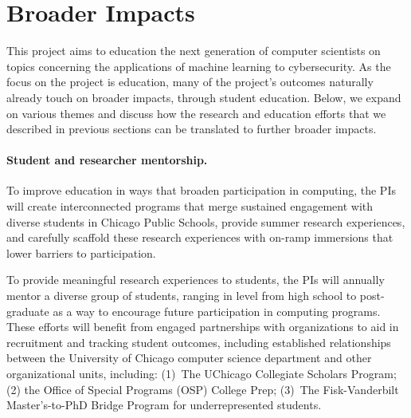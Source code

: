 \section{Broader Impacts}\label{sec:impacts}

This project aims to education the next generation of computer scientists on
topics concerning the applications of machine learning to cybersecurity.  As
the focus on the project is education, many of the project's outcomes
naturally already touch on broader impacts, through student education. Below,
we expand on various themes and discuss how the research and education efforts
that we described in previous sections can be translated to further broader
impacts.


\paragraph{Student and researcher mentorship.} To improve education in ways
that broaden participation in computing, the PIs will create interconnected
programs that merge sustained engagement with diverse students in Chicago
Public Schools, provide summer research experiences, and carefully scaffold
these research experiences with on-ramp immersions that lower barriers to
participation.  

To provide meaningful research experiences to students, the PIs will annually
mentor a diverse group of students, ranging in level from high school to
post-graduate as a way to encourage future participation in computing
programs. These efforts will benefit from engaged partnerships with
organizations to aid in recruitment and tracking student outcomes, including
established relationships between the University of Chicago computer science
department and other organizational units, including: (1)~The UChicago
Collegiate Scholars Program; (2) the Office of Special Programs (OSP) College
Prep; (3)~The Fisk-Vanderbilt Master's-to-PhD Bridge Program for
underrepresented students.

